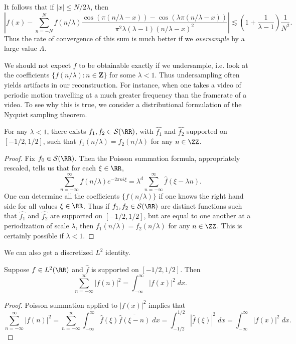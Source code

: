 %
It follows that if $|x| \leq N/2\lambda$, then
%
\[ \left| f(x) - \sum_{n = -N}^N f(n/\lambda) \frac{\cos(\pi (n / \lambda - x)) - \cos(\lambda \pi (n / \lambda - x))}{\pi^2 \lambda (\lambda - 1)(n/\lambda - x)^2} \right| \lesssim \left( 1 + \frac{1}{\lambda - 1} \right) \frac{1}{N^2}. \]
%
Thus the rate of convergence of this sum is much better if we \emph{oversample} by a large value $\Lambda$.

We should not expect $f$ to be obtainable exactly if we undersample, i.e. look at the coefficients $\{ f(n/\lambda) : n \in \mathbf{Z} \}$ for some $\lambda < 1$. Thus undersampling often yields artifacts in our reconstruction. For instance, when one takes a video of periodic motion travelling at a much greater frequency than the framerate of a video. To see why this is true, we consider a distributional formulation of the Nyquist sampling theorem.

\begin{theorem}
    For any $\lambda < 1$, there exists $f_1,f_2 \in \mathcal{S}(\RR)$, with $\widehat{f_1}$ and $\widehat{f_2}$ supported on $[-1/2,1/2]$, such that $f_1(n/\lambda) = f_2(n/\lambda)$ for any $n \in \ZZ$.
\end{theorem}
\begin{proof}
    Fix $f_0 \in \mathcal{S}(\RR)$. Then the Poisson summation formula, appropriately rescaled, tells us that for each $\xi \in \RR$,
    \[ \sum_{n = -\infty}^\infty f(n/\lambda) e^{-2 \pi n i \xi} = \lambda^d \sum_{n = -\infty}^\infty \widehat{f}(\xi - \lambda n). \]
    One can determine all the coefficients $\{ f(n/\lambda) \}$ if one knows the right hand side for all values $\xi \in \RR$. Thus if $f_1,f_2 \in \mathcal{S}(\RR)$ are distinct functions such that $\widehat{f_1}$ and $\widehat{f_2}$ are supported on $[-1/2,1/2]$, but are equal to one another at a periodization of scale $\lambda$, then $f_1(n/\lambda) = f_2(n/\lambda)$ for any $n \in \ZZ$. This is certainly possible if $\lambda < 1$.
\end{proof}

We can also get a discretized $L^2$ identity.

\begin{theorem}
    Suppose $f \in L^2(\RR)$ and $\widehat{f}$ is supported on $[-1/2,1/2]$. Then
    \[ \sum_{n = -\infty}^\infty |f(n)|^2 = \int_{-\infty}^\infty |f(x)|^2\; dx. \]
\end{theorem}
\begin{proof}
    Poisson summation applied to $|f(x)|^2$ implies that
    \[ \sum_{n = -\infty}^\infty |f(n)|^2 = \sum_{n = -\infty}^\infty \int_{-\infty}^\infty \widehat{f}(\xi) \overline{\widehat{f}(\xi - n)}\; dx = \int_{-1/2}^{1/2} |\widehat{f}(\xi)|^2\; dx = \int_{-\infty}^\infty |f(x)|^2\; dx. \]
\end{proof}

